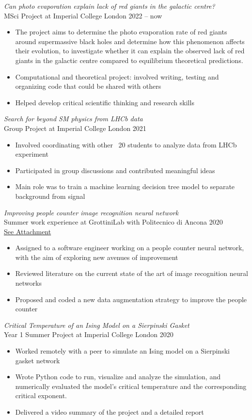 \documentclass{res} %
\begin{document}
\begin{resume}
{\sl Can photo evaporation explain lack of red giants in the galactic centre?}\\ MSci Project at Imperial College London \hfill 2022 -- now
\begin{itemize}
\item The project aims to determine the photo evaporation rate of red giants around supermassive black holes and determine how this phenomenon affects their evolution, to investigate whether it can explain the observed lack of red giants in the galactic centre compared to equilibrium theoretical predictions.
\item Computational and theoretical project: involved writing, testing and organizing code that could be shared with others
\item Helped develop critical scientific thinking and research skills
\end{itemize}

{\sl Search for beyond SM physics from LHCb data}\\ Group Project at Imperial College London \hfill 2021
\begin{itemize}
\item Involved coordinating with other ~20 students to analyze data from LHCb experiment
\item Participated in group discussions and contributed meaningful ideas
\item Main role was to train a machine learning decision tree model to separate background from signal
\end{itemize}


{\sl Improving people counter image recognition neural network} \\ Summer work experience at GrottiniLab with Politecnico di Ancona \hfill 2020 \\ \href{https://github.com/jacopouggeri/curriculumVitae/blob/84ad9712112b11ea237b126a98ba1764b27054b4/attachments/grottini.pdf}{See Attachment}
\begin{itemize}
\item Assigned to a software engineer working on a people counter neural network, with the aim of exploring new avenues of improvement
\item Reviewed literature on the current state of the art of image recognition neural networks
\item Proposed and coded a new data augmentation strategy to improve the people counter
\end{itemize}

{\sl Critical Temperature of an Ising Model on a Sierpinski Gasket} \\ Year 1 Summer Project at Imperial College London  \hfill 2020
\begin{itemize}
\item Worked remotely with a peer to simulate an Ising model on a Sierpinski gasket network
\item Wrote Python code to run, visualize and analyze the simulation, and numerically evaluated the model’s critical temperature and the corresponding critical exponent.
\item Delivered a video summary of the project and a detailed report
\end{itemize}



\end{resume}
\end{document}
